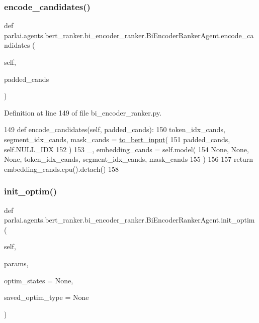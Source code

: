 \subsubsection{\texorpdfstring{encode\+\_\+candidates()}{encode\_candidates()}}
{\footnotesize\ttfamily def parlai.\+agents.\+bert\+\_\+ranker.\+bi\+\_\+encoder\+\_\+ranker.\+Bi\+Encoder\+Ranker\+Agent.\+encode\+\_\+candidates (\begin{DoxyParamCaption}\item[{}]{self,  }\item[{}]{padded\+\_\+cands }\end{DoxyParamCaption})}



Definition at line 149 of file bi\+\_\+encoder\+\_\+ranker.\+py.


\begin{DoxyCode}
149     \textcolor{keyword}{def }encode\_candidates(self, padded\_cands):
150         token\_idx\_cands, segment\_idx\_cands, mask\_cands = \hyperlink{namespaceparlai_1_1agents_1_1bert__ranker_1_1bi__encoder__ranker_afd88e1e1699d975ab19ea38e8ae77e20}{to\_bert\_input}(
151             padded\_cands, self.NULL\_IDX
152         )
153         \_, embedding\_cands = self.model(
154             \textcolor{keywordtype}{None}, \textcolor{keywordtype}{None}, \textcolor{keywordtype}{None}, token\_idx\_cands, segment\_idx\_cands, mask\_cands
155         )
156 
157         \textcolor{keywordflow}{return} embedding\_cands.cpu().detach()
158 
\end{DoxyCode}
\mbox{\label{classparlai_1_1agents_1_1bert__ranker_1_1bi__encoder__ranker_1_1BiEncoderRankerAgent_a14ad454025e3db96b5f34e1270e44254}} 
\subsubsection{\texorpdfstring{init\+\_\+optim()}{init\_optim()}}
{\footnotesize\ttfamily def parlai.\+agents.\+bert\+\_\+ranker.\+bi\+\_\+encoder\+\_\+ranker.\+Bi\+Encoder\+Ranker\+Agent.\+init\+\_\+optim (\begin{DoxyParamCaption}\item[{}]{self,  }\item[{}]{params,  }\item[{}]{optim\+\_\+states = {\ttfamily None},  }\item[{}]{saved\+\_\+optim\+\_\+type = {\ttfamily None} }\end{DoxyParamCaption})}



